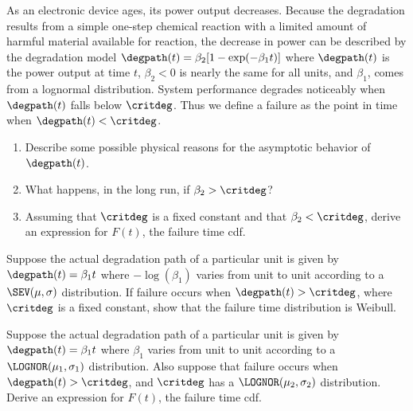 \begin{exercise}
\label{exercise:asym.deg}
As an electronic device ages, its power output decreases.  Because the
degradation results from a simple one-step chemical reaction with a
limited amount of harmful material available for reaction, the
decrease in power can be described by the degradation model
$\degpath(t) = \beta_{2}[1 -  \exp(-\beta_{1} t )]$
where $\degpath(t)$ is the power output at time $t$, $\beta_{2} < 0
$ is nearly the same for all units, and $\beta_{1}$, comes from a
lognormal distribution.  System performance degrades noticeably when
$\degpath(t)$ falls below $\critdeg$. Thus we define a failure as
the point in time when $\degpath(t) < \critdeg$.
\begin{enumerate}
\item
Describe some possible physical reasons for the asymptotic behavior of
$\degpath(t)$.
\item
What happens, in the long run, if $\beta_{2} > \critdeg $?
\item
Assuming that $\critdeg$ is a fixed constant and that
$\beta_{2} < \critdeg $, derive an
expression for $F(t)$, the failure time cdf.
\end{enumerate}
\end{exercise}

\begin{exercise}
Suppose the actual degradation path of a particular unit is given by
$\degpath(t) = \beta_{1} t$ where $-\log(\beta_{1})$ varies from
unit to unit according to a $\SEV(\mu, \sigma)$ distribution. If
failure occurs when $\degpath(t) > \critdeg$, where $\critdeg$ is a
fixed constant, show that the failure time distribution is Weibull.
\end{exercise}

\begin{exercise1}
Suppose the actual degradation path of a particular unit is given by
$\degpath(t) = \beta_{1} t$ 
where $\beta_{1}$ varies from unit to unit according to a
$\LOGNOR(\mu_{1}, \sigma_{1})$ distribution. Also suppose that failure
occurs when $\degpath(t) > \critdeg$, and $\critdeg$ has a
$\LOGNOR(\mu_{2},
\sigma_{2})$ distribution. Derive an
expression for $F(t)$, the failure time cdf.
\end{exercise1}

